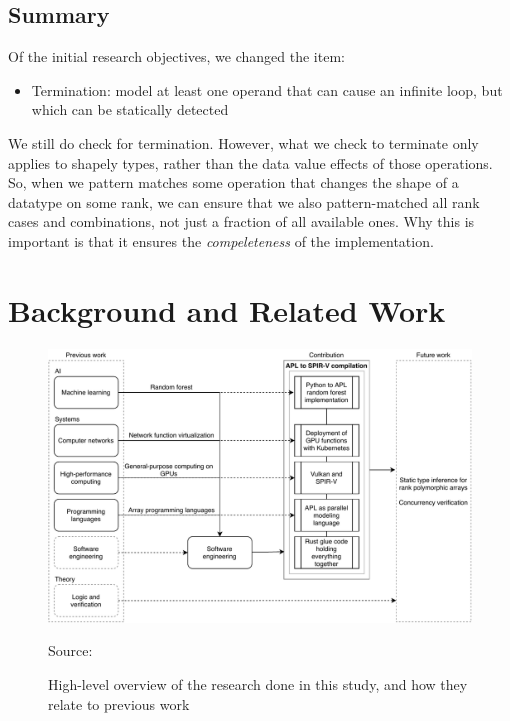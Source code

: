 \documentclass{report}
\newcommand{\source}[1]{\caption*{Source: {#1}} }
\begin{document}
\section*{Summary}

Of the initial research objectives, we changed the item:

\begin{itemize}
  \item Termination: model at least one operand that can cause an infinite loop, but which can be statically detected
\end{itemize}

We still do check for termination. However, what we check to terminate only applies to shapely types, rather than the data value effects of those operations. So, when we pattern matches some operation that changes the shape of a datatype on some rank, we can ensure that we also pattern-matched all rank cases and combinations, not just a fraction of all available ones. Why this is important is that it ensures the \emph{compeleteness} of the implementation.

\chapter{Background and Related Work}
\label{ch:bg}

\begin{figure}
  \centering
  \includegraphics[width=\columnwidth]{./assets/overview.pdf}
  \caption{High-level overview of the research done in this study, and how they relate to previous work}
  \source{\cite{gpupoly}}
  \label{fig:ov}
\end{figure}
\end{document}
